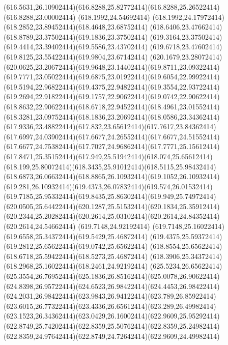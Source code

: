 {{	\curveto(616.5631,26.10902414)(616.8288,25.82772414)(616.8288,25.26522414)
	\lineto(616.8288,23.00002414)
	\closepath
	\moveto(618.1992,24.54692414)
	\curveto(618.1992,24.17972414)(618.2852,23.89452414)(618.4648,23.68752414)
	\curveto(618.6406,23.47662414)(618.8789,23.37502414)(619.1836,23.37502414)
	\curveto(619.3164,23.37502414)(619.4414,23.39402414)(619.5586,23.43702414)
	\curveto(619.6718,23.47602414)(619.8125,23.55422414)(619.9804,23.67142414)
	\lineto(620.1679,23.28072414)
	\curveto(620.0625,23.20672414)(619.9648,23.14402414)(619.8711,23.09322414)
	\curveto(619.7771,23.05022414)(619.6875,23.01922414)(619.6054,22.99922414)
	\curveto(619.5194,22.96822414)(619.4375,22.94822414)(619.3554,22.93722414)
	\curveto(619.2694,22.91822414)(619.1757,22.90622414)(619.0742,22.90622414)
	\curveto(618.8632,22.90622414)(618.6718,22.94522414)(618.4961,23.01552414)
	\curveto(618.3281,23.09752414)(618.1836,23.20692414)(618.0586,23.34362414)
	\curveto(617.9336,23.48822414)(617.832,23.65612414)(617.7617,23.84362414)
	\curveto(617.6997,24.03902414)(617.6677,24.26552414)(617.6677,24.51552414)
	\curveto(617.6677,24.75382414)(617.7027,24.96862414)(617.7771,25.15612414)
	\curveto(617.8471,25.35152414)(617.949,25.51942414)(618.074,25.65612414)
	\curveto(618.199,25.80072414)(618.3435,25.91012414)(618.5115,25.98432414)
	\curveto(618.6873,26.06632414)(618.8865,26.10932414)(619.1052,26.10932414)
	\curveto(619.281,26.10932414)(619.4373,26.07832414)(619.574,26.01532414)
	\curveto(619.7185,25.95332414)(619.8435,25.86302414)(619.949,25.74972414)
	\curveto(620.0505,25.64422414)(620.1287,25.51532414)(620.1834,25.35912414)
	\curveto(620.2344,25.20282414)(620.2614,25.03102414)(620.2614,24.84352414)
	\lineto(620.2614,24.54662414)
	\closepath
	\moveto(619.7148,24.92192414)
	\curveto(619.7148,25.16022414)(619.6558,25.34372414)(619.5429,25.46872414)
	\curveto(619.4375,25.59372414)(619.2812,25.65622414)(619.0742,25.65622414)
	\curveto(618.8554,25.65622414)(618.6718,25.59422414)(618.5273,25.46872414)
	\curveto(618.3906,25.34372414)(618.2968,25.16022414)(618.2461,24.92192414)
	\closepath
	\moveto(625.5234,26.65622414)
	\curveto(625.3554,26.76952414)(625.1836,26.85162414)(625.0078,26.90622414)
	\curveto(624.8398,26.95722414)(624.6523,26.98422414)(624.4453,26.98422414)
	\curveto(624.2031,26.98422414)(623.9843,26.94122414)(623.789,26.85922414)
	\curveto(623.6015,26.77322414)(623.4336,26.65612414)(623.289,26.49982414)
	\curveto(623.1523,26.34362414)(623.0429,26.16002414)(622.9609,25.95292414)
	\curveto(622.8749,25.74202414)(622.8359,25.50762414)(622.8359,25.24982414)
	\curveto(622.8359,24.97642414)(622.8749,24.72642414)(622.9609,24.49982414)
}}
